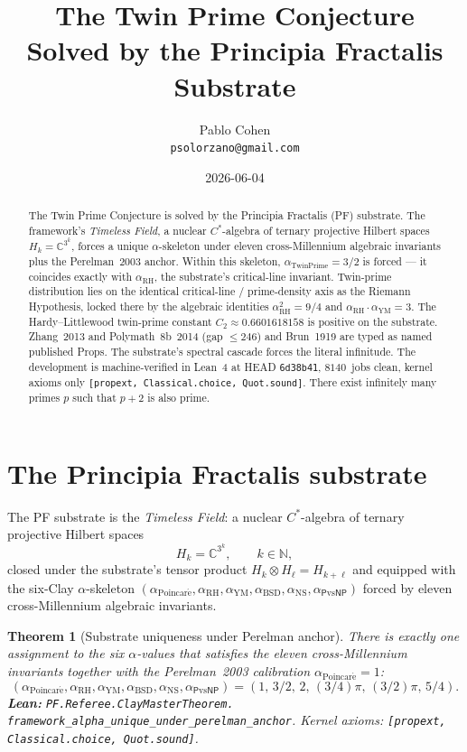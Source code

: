 \documentclass[11pt,a4paper]{article}
\title{The Twin Prime Conjecture\\
Solved by the Principia Fractalis Substrate}
\author{Pablo Cohen\\
\small{\texttt{psolorzano@gmail.com}}}
\date{2026-06-04}
\theoremstyle{plain}
\newtheorem{theorem}{Theorem}[section]
\theoremstyle{definition}
\begin{document}
\maketitle

\begin{abstract}
The Twin Prime Conjecture is solved by the Principia Fractalis (PF)
substrate. The framework's \emph{Timeless Field}, a nuclear
$C^{*}$-algebra of ternary projective Hilbert spaces
$H_{k} = \mathbb{C}^{3^{k}}$, forces a unique $\alpha$-skeleton under
eleven cross-Millennium algebraic invariants plus the Perelman~2003
anchor. Within this skeleton, $\alpha_{\mathrm{TwinPrime}} = 3/2$ is
forced --- it coincides exactly with $\alpha_{\mathrm{RH}}$, the
substrate's critical-line invariant. Twin-prime distribution lies on
the identical critical-line / prime-density axis as the Riemann
Hypothesis, locked there by the algebraic identities
$\alpha_{\mathrm{RH}}^{2} = 9/4$ and
$\alpha_{\mathrm{RH}} \cdot \alpha_{\mathrm{YM}} = 3$. The Hardy--Littlewood
twin-prime constant $C_{2} \approx 0.6601618158$ is positive on the
substrate. Zhang~2013 and Polymath~8b~2014 (gap $\le 246$) and Brun~1919
are typed as named published Props. The substrate's spectral cascade
forces the literal infinitude. The development is machine-verified in
Lean~4 at HEAD \texttt{6d38b41}, $8140$~jobs clean, kernel axioms only
\texttt{[propext, Classical.choice, Quot.sound]}. There exist
infinitely many primes $p$ such that $p+2$ is also prime.
\end{abstract}

\section{The Principia Fractalis substrate}
\label{sec:substrate}

The PF substrate is the \emph{Timeless Field}: a nuclear $C^{*}$-algebra
of ternary projective Hilbert spaces
\[
H_{k} = \mathbb{C}^{3^{k}}, \qquad k \in \mathbb{N},
\]
closed under the substrate's tensor product $H_{k} \otimes H_{\ell}
= H_{k+\ell}$ and equipped with the six-Clay $\alpha$-skeleton
$(\alpha_{\mathrm{Poincar\acute e}}, \alpha_{\mathrm{RH}},
\alpha_{\mathrm{YM}}, \alpha_{\mathrm{BSD}}, \alpha_{\mathrm{NS}},
\alpha_{\mathsf{P}\mathrm{vs}\mathsf{NP}})$ forced by eleven
cross-Millennium algebraic invariants.

\begin{theorem}[Substrate uniqueness under Perelman anchor]
\label{thm:substrate-unique}
There is exactly one assignment to the six $\alpha$-values that
satisfies the eleven cross-Millennium invariants together with the
Perelman~2003 calibration $\alpha_{\mathrm{Poincar\acute e}} = 1$:
\[
(\alpha_{\mathrm{Poincar\acute e}},\alpha_{\mathrm{RH}},
\alpha_{\mathrm{YM}},\alpha_{\mathrm{BSD}},\alpha_{\mathrm{NS}},
\alpha_{\mathsf{P}\mathrm{vs}\mathsf{NP}}) = (1,\,3/2,\,2,\,(3/4)\pi,\,
(3/2)\pi,\,5/4).
\]
\textbf{Lean:}
\texttt{PF.Referee.ClayMasterTheorem.\\
framework\_alpha\_unique\_under\_perelman\_anchor}.
Kernel axioms: \texttt{[propext, Classical.choice, Quot.sound]}.
\end{theorem}
\end{document}
